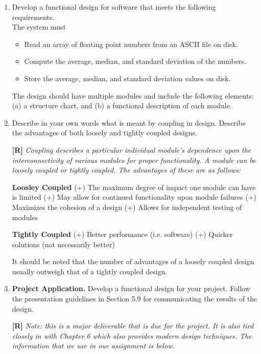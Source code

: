 \begin{enumerate}
\item
  Develop a functional design for software that meets the following
  requirements. \\
The system must

\begin{itemize}
\item
  Read an array of floating point numbers from an ASCII file on disk.
\item
  Compute the average, median, and standard deviation of the numbers.
\item
  Store the average, median, and standard deviation values on disk.
\end{itemize}

The design should have multiple modules and include the following
elements: (a) a structure chart, and (b) a functional description of
each module.



\item
  Describe in your own words what is meant by coupling in design.
  Describe the advantages of both loosely and tightly coupled designs.

  \begin{onlysolution}
    \textbf{[R]}
    \itshape
    Coupling describes a particular individual module’s dependence upon 
    the interconnectivity of various modules for proper functionality. 
    A module can be loosely coupled or tightly coupled. The advantages 
    of these are as follows:

    \textbf{Loosley Coupled}
    (+) The maximum degree of impact one module can have is limited 
    (+) May allow for continued functionality upon module failures
    (+) Maximizes the cohesion of a design
    (+) Allows for independent testing of modules

    \textbf{Tightly Coupled}
    (+) Better performance (i.e. software)
    (+) Quicker solutions (not necessarily better)

    It should be noted that the number of advantages of a loosely coupled 
    design usually outweigh that of a tightly coupled design.
  \end{onlysolution}

\item
  \textbf{Project Application.} Develop a functional design for your
  project. Follow the presentation guidelines in Section 5.9 for
  communicating the results of the design.

  \begin{onlysolution}
    \textbf{[R]}
    \itshape
    \emph{Note:} this is a major deliverable that is due for the project. 
    It is also tied closely in with Chapter 6 which also provides modern 
    design techniques. The information that we use in our assignment is 
    below.
  \end{onlysolution}

\end{enumerate}

